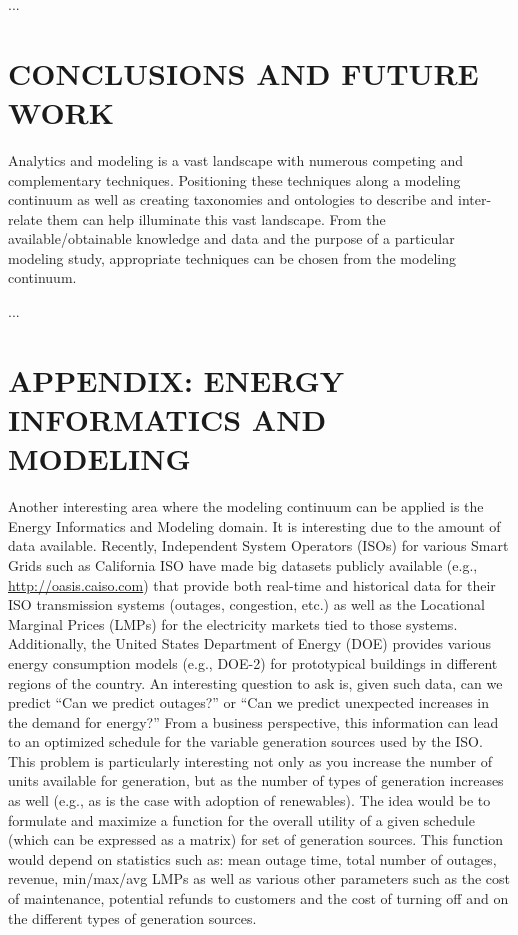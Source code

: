 \documentclass{wscpaperproc}
\theoremstyle{wsc}
\begin{document}
...

\section{CONCLUSIONS AND FUTURE WORK}

Analytics and modeling is a vast landscape with numerous
competing and complementary techniques.
Positioning these techniques along a modeling continuum as well as
creating taxonomies and ontologies to describe and inter-relate them
can help illuminate this vast landscape.
From the available/obtainable knowledge and data and the purpose
of a particular modeling study, appropriate techniques can
be chosen from the modeling continuum.

...




\section*{APPENDIX: ENERGY INFORMATICS AND MODELING}

Another interesting area where the modeling continuum can be applied is the
Energy Informatics and Modeling domain.
It is interesting due to the amount of data available.
Recently, Independent System Operators (ISOs) for various Smart Grids such as
California ISO have made big datasets publicly available
(e.g., \url{http://oasis.caiso.com}) that provide both real-time and historical data
for their ISO transmission systems (outages, congestion, etc.) as well as the
Locational Marginal Prices (LMPs) for the electricity markets tied to those systems.
Additionally, the United States Department of Energy (DOE) provides various
energy consumption models (e.g., DOE-2) for prototypical buildings in different
regions of the country.
An interesting question to ask is, given such data, can we predict
``Can we predict outages?'' or ``Can we predict unexpected increases in the
demand for energy?''
From a business perspective, this information can lead to an optimized schedule
for the variable generation sources used by the ISO.
This problem is particularly interesting not only as you increase the number of
units available for generation, but as the number of types of generation
increases as well (e.g., as is the case with adoption of renewables).
The idea would be to formulate and maximize a function for the overall utility
of a given schedule (which can be expressed as a matrix) for set of generation sources.
This function would depend on statistics such as:  mean outage time, total number
of outages, revenue, min/max/avg LMPs as well as various other parameters such
as the cost of maintenance, potential refunds to customers and the cost of
turning off and on the different types of generation sources.
\end{document}

